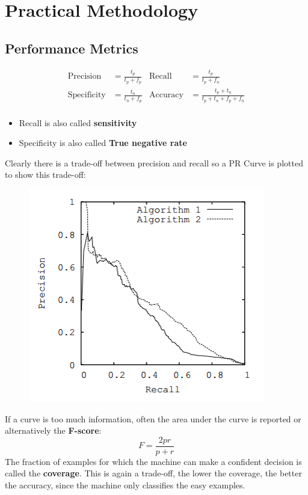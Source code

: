 \section{Practical Methodology}
\begin{multicols}{2}
	\subsection{Performance Metrics}
	\begin{align*}
	\text{Precision} &= \frac{t_p}{t_p+f_p} & \text{Recall} &= \frac{t_p}{t_p+f_n}\\
	\text{Specificity} &= \frac{t_n}{t_n+f_p} & \text{Accuracy} &= \frac{t_p+t_n}{t_p+t_n+f_p+f_n}\\
	\end{align*}
	\begin{itemize}
		\item Recall is also called \textbf{sensitivity}
		\item Specificity is also called \textbf{True negative rate}
	\end{itemize}
	Clearly there is a trade-off between precision and recall so a PR Curve is plotted to show this trade-off:
	\begin{figure}[H]
		\centering
		\includegraphics[width=0.75\linewidth]{images/pr_curve.png}
	\end{figure}
	If a curve is too much information, often the area under the curve is reported or alternatively the \textbf{F-score}:
	\[ F = \frac{2pr}{p+r} \]
	The fraction of examples for which the machine can make a confident decision is called the \textbf{coverage}.
	This is again a trade-off, the lower the coverage, the better the accuracy, since the machine only classifies the easy examples.\\


\end{multicols}
